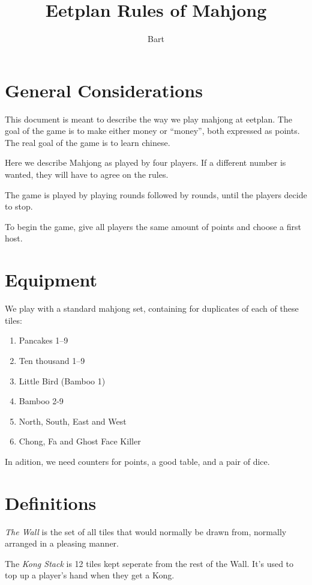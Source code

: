 \documentclass{article}
\begin{document}
\title{Eetplan Rules of Mahjong}
\author{Bart}
\maketitle

\section{General Considerations}
This document is meant to describe the way we play mahjong at eetplan. The goal of the game is to make either money or ``money'', both expressed as points. The real goal of the game is to learn chinese.

Here we describe Mahjong as played by four players. If a different number is wanted, they will have to agree on the rules.

The game is played by playing rounds followed by rounds, until the players decide to stop.

To begin the game, give all players the same amount of points and choose a first host.

\section{Equipment}
We play with a standard mahjong set, containing for duplicates of each of these tiles:
\begin{enumerate}
    \item Pancakes 1--9
    \item Ten thousand 1--9
    \item Little Bird (Bamboo 1)
    \item Bamboo 2-9
    \item North, South, East and West
    \item Chong, Fa and Ghost Face Killer
\end{enumerate}

In adition, we need counters for points, a good table, and a pair of dice.

\section{Definitions}
\emph{The Wall} is the set of all tiles that would normally be drawn from, normally arranged in a pleasing manner.

The \emph{Kong Stack} is 12 tiles kept seperate from the rest of the Wall. It's used to top up a player's hand when they get a Kong.
\end{document}
